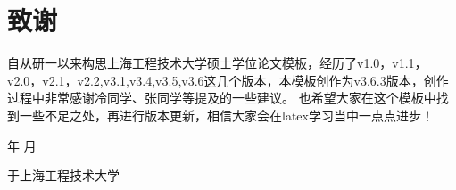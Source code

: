 \chapter{致谢}
自从研一以来构思上海工程技术大学硕士学位论文模板，经历了v1.0，v1.1，v2.0，v2.1，v2.2,v3.1,v3.4,v3.5,v3.6这几个版本，本模板创作为v3.6.3版本，创作过程中非常感谢冷同学、张同学等提及的一些建议。
也希望大家在这个模板中找到一些不足之处，再进行版本更新，相信大家会在latex学习当中一点点进步！

\vspace{0.56\textheight}

\begin{flushright}
    \number\year  年 \number\month  月
    
    于上海工程技术大学
\end{flushright}

